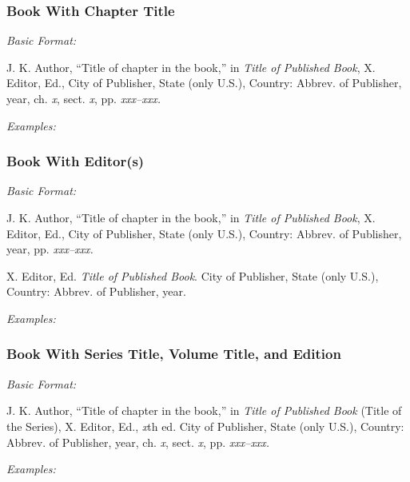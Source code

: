 \documentclass[10pt]{article}
\newcommand*{\guidelabel}[1]{\par\vspace{-4pt}\hspace*{22pt}\textit{#1}\par\vspace{-\parskip}}
\begin{document}
\subsubsection{Book With Chapter Title}
\guidelabel{Basic Format:}
\begin{guideitems}
  \item J. K. Author, “Title of chapter in the book,” in \textit{Title of Published Book}, X. Editor, Ed., City of Publisher, State (only U.S.), Country: Abbrev. of Publisher, year, ch. \textit{x}, sect. \textit{x}, pp. \textit{xxx–xxx.}
\end{guideitems}
\guidelabel{Examples:}
\begin{guideitems}
  \item {}
  \item {}
\end{guideitems}

\subsubsection{Book With Editor(s)}
\guidelabel{Basic Format:}
\begin{guideitems}
  \item J. K. Author, “Title of chapter in the book,” in \textit{Title of Published Book}, X. Editor, Ed., City of Publisher, State (only U.S.), Country: Abbrev. of Publisher, year, pp. \textit{xxx–xxx.}
  \item X. Editor, Ed. \textit{Title of Published Book}. City of Publisher, State (only U.S.), Country: Abbrev. of Publisher, year.
\end{guideitems}
\guidelabel{Examples:}
\begin{guideitems}
  \item {}
  \item {}
  \item {}
\end{guideitems}

\subsubsection{Book With Series Title, Volume Title, and Edition}
\guidelabel{Basic Format:}
\begin{guideitems}
  \item J. K. Author, “Title of chapter in the book,” in \textit{Title of Published Book} (Title of the Series), X. Editor, Ed., \textit{x}th ed. City of Publisher, State (only U.S.), Country: Abbrev. of Publisher, year, ch. \textit{x}, sect. \textit{x}, pp. \textit{xxx–xxx.}
\end{guideitems}
\guidelabel{Examples:}
\begin{guideitems}
  \item {}
  \item {}
  \item {}
\end{guideitems}
\end{document}
